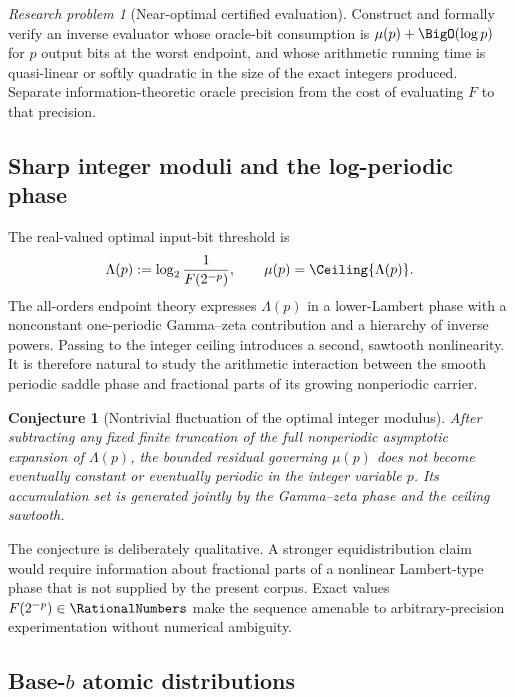 \documentclass[11pt,oneside]{article}
\newtheorem{conjecture}[theorem]{Conjecture}
\theoremstyle{definition}
\theoremstyle{remark}
\numberwithin{equation}{section}
\newtheorem{problem}[theorem]{Research problem}
\begin{document}
\begin{problem}[Near-optimal certified evaluation]
Construct and formally verify an inverse evaluator whose oracle-bit
consumption is $\mu(p)+\BigO(\log p)$ for $p$ output bits at the worst endpoint,
and whose arithmetic running time is quasi-linear or softly quadratic in the
size of the exact integers produced.  Separate information-theoretic oracle
precision from the cost of evaluating $F$ to that precision.
\end{problem}

\subsection{Sharp integer moduli and the log-periodic phase}

The real-valued optimal input-bit threshold is
\[
 \Lambda(p):=\log_2\frac1{F(2^{-p})},
 \qquad \mu(p)=\Ceiling{\Lambda(p)}.
\]
The all-orders endpoint theory expresses $\Lambda(p)$ in a lower-Lambert
phase with a nonconstant one-periodic Gamma--zeta contribution and a hierarchy
of inverse powers.  Passing to the integer ceiling introduces a second,
sawtooth nonlinearity.  It is therefore natural to study the arithmetic
interaction between the smooth periodic saddle phase and fractional parts of
its growing nonperiodic carrier.

\begin{conjecture}[Nontrivial fluctuation of the optimal integer modulus]
\label{conj:integer-modulus}
After subtracting any fixed finite truncation of the full nonperiodic
asymptotic expansion of $\Lambda(p)$, the bounded residual governing
$\mu(p)$ does not become eventually constant or eventually periodic in the
integer variable $p$.  Its accumulation set is generated jointly by the
Gamma--zeta phase and the ceiling sawtooth.
\end{conjecture}

The conjecture is deliberately qualitative.  A stronger equidistribution
claim would require information about fractional parts of a nonlinear
Lambert-type phase that is not supplied by the present corpus.  Exact values
$F(2^{-p})\in\RationalNumbers$ make the sequence amenable to arbitrary-precision
experimentation without numerical ambiguity.

\subsection{Base-\texorpdfstring{$b$}{b} atomic distributions}
\end{document}
